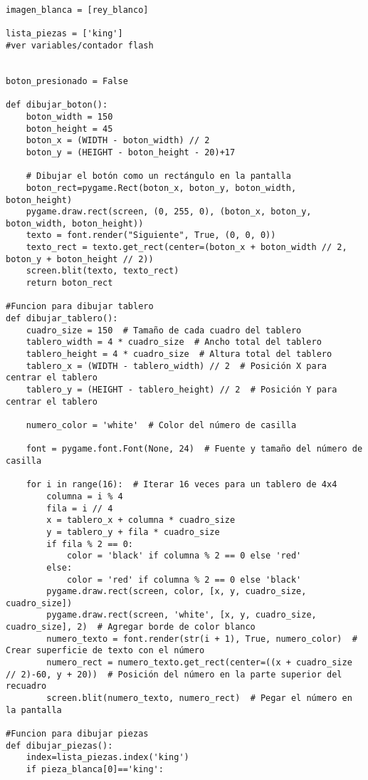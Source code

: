 \begin{lstlisting}
imagen_blanca = [rey_blanco]

lista_piezas = ['king']
#ver variables/contador flash


boton_presionado = False

def dibujar_boton():
    boton_width = 150
    boton_height = 45
    boton_x = (WIDTH - boton_width) // 2
    boton_y = (HEIGHT - boton_height - 20)+17

    # Dibujar el botón como un rectángulo en la pantalla
    boton_rect=pygame.Rect(boton_x, boton_y, boton_width, boton_height)
    pygame.draw.rect(screen, (0, 255, 0), (boton_x, boton_y, boton_width, boton_height))
    texto = font.render("Siguiente", True, (0, 0, 0))
    texto_rect = texto.get_rect(center=(boton_x + boton_width // 2, boton_y + boton_height // 2))
    screen.blit(texto, texto_rect)
    return boton_rect
    
#Funcion para dibujar tablero
def dibujar_tablero():
    cuadro_size = 150  # Tamaño de cada cuadro del tablero
    tablero_width = 4 * cuadro_size  # Ancho total del tablero
    tablero_height = 4 * cuadro_size  # Altura total del tablero
    tablero_x = (WIDTH - tablero_width) // 2  # Posición X para centrar el tablero
    tablero_y = (HEIGHT - tablero_height) // 2  # Posición Y para centrar el tablero
    
    numero_color = 'white'  # Color del número de casilla

    font = pygame.font.Font(None, 24)  # Fuente y tamaño del número de casilla

    for i in range(16):  # Iterar 16 veces para un tablero de 4x4
        columna = i % 4
        fila = i // 4
        x = tablero_x + columna * cuadro_size
        y = tablero_y + fila * cuadro_size
        if fila % 2 == 0:
            color = 'black' if columna % 2 == 0 else 'red'
        else:
            color = 'red' if columna % 2 == 0 else 'black'
        pygame.draw.rect(screen, color, [x, y, cuadro_size, cuadro_size])
        pygame.draw.rect(screen, 'white', [x, y, cuadro_size, cuadro_size], 2)  # Agregar borde de color blanco
        numero_texto = font.render(str(i + 1), True, numero_color)  # Crear superficie de texto con el número
        numero_rect = numero_texto.get_rect(center=((x + cuadro_size // 2)-60, y + 20))  # Posición del número en la parte superior del recuadro
        screen.blit(numero_texto, numero_rect)  # Pegar el número en la pantalla

#Funcion para dibujar piezas
def dibujar_piezas():
    index=lista_piezas.index('king')
    if pieza_blanca[0]=='king':     
        

\end{lstlisting}
